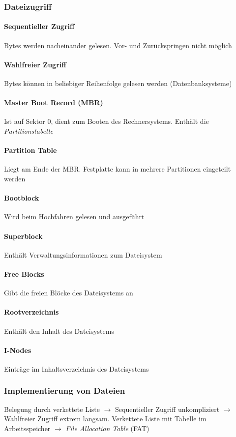 \documentclass[10pt,a4paper,landscape]{article}
\begin{document}
\begin{multicols*}{3}
	\subsubsection{Dateizugriff}
	\paragraph{Sequentieller Zugriff} Bytes werden nacheinander gelesen. Vor- und Zurückspringen nicht möglich
	\paragraph{Wahlfreier Zugriff} Bytes können in beliebiger Reihenfolge gelesen werden (Datenbanksysteme)
	\paragraph{Master Boot Record (MBR)} Ist auf Sektor 0, dient zum Booten des Rechnersystems. Enthält die \textit{Partitionstabelle}
	\paragraph{Partition Table} Liegt am Ende der MBR. Festplatte kann in mehrere Partitionen eingeteilt werden
	\paragraph{Bootblock} Wird beim Hochfahren gelesen und ausgeführt
	\paragraph{Superblock} Enthält Verwaltungsinformationen zum Dateisystem
	\paragraph{Free Blocks} Gibt die freien Blöcke des Dateisystems an
	\paragraph{Rootverzeichnis} Enthält den Inhalt des Dateisystems
	\paragraph{I-Nodes} Einträge im Inhaltsverzeichnis des Dateisystems
	\subsubsection{Implementierung von Dateien}
	Belegung durch verkettete Liste $\rightarrow$ Sequentieller Zugriff unkompliziert $\rightarrow$ Wahlfreier Zugriff extrem langsam. Verkettete Liste mit Tabelle im Arbeitsspeicher $\rightarrow$ \textit{File Allocation Table} (FAT)

\end{multicols*}
\end{document}
